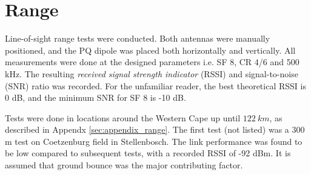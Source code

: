 \graphicspath{{./figures}}

\section{Range}

Line-of-sight range tests were conducted. Both antennas were manually positioned, and the PQ dipole was placed both horizontally and vertically. All measurements were done at the designed parameters i.e. SF 8, CR 4/6 and 500 kHz. The resulting \textit{received signal strength indicator} (RSSI) and signal-to-noise (SNR) ratio was recorded. For the unfamiliar reader, the best theoretical RSSI is 0 dB, and the minimum SNR for SF 8 is -10 dB.

Tests were done in locations around the Western Cape up until $\SI{122}{km}$, as described in Appendx \ref{sec:appendix_range}. The first test (not listed) was a 300 m test on Coetzenburg field in Stellenbosch. The link performance was found to be low compared to subsequent tests, with a recorded RSSI of -92 dBm. It is assumed that ground bounce was the major contributing factor.

